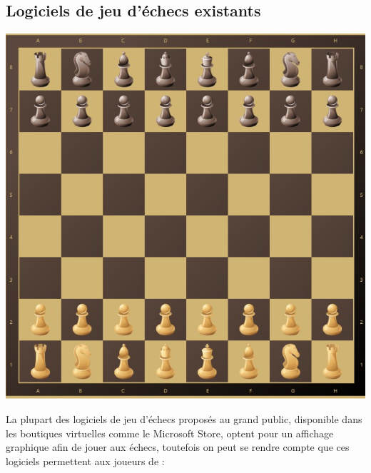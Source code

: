 \documentclass{article}
\begin{document}
\subsection{Logiciels de jeu d'échecs existants}
\centerline{\includegraphics[scale = 0.25]{img/Echiquier.png}}
La plupart des logiciels de jeu d'échecs proposés au grand public, disponible dans les boutiques virtuelles comme le Microsoft Store, optent pour un affichage graphique afin de jouer aux échecs, toutefois on peut se rendre compte que ces logiciels permettent aux joueurs de :
\end{document}

